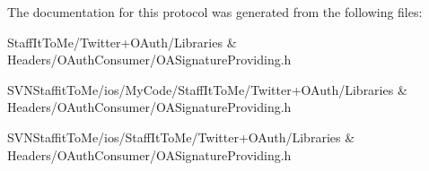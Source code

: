 \-The documentation for this protocol was generated from the following files\-:\begin{DoxyCompactItemize}
\item 
\-Staff\-It\-To\-Me/\-Twitter+\-O\-Auth/\-Libraries \& Headers/\-O\-Auth\-Consumer/\-O\-A\-Signature\-Providing.\-h\item 
\-S\-V\-N\-Staffit\-To\-Me/ios/\-My\-Code/\-Staff\-It\-To\-Me/\-Twitter+\-O\-Auth/\-Libraries \& Headers/\-O\-Auth\-Consumer/\-O\-A\-Signature\-Providing.\-h\item 
\-S\-V\-N\-Staffit\-To\-Me/ios/\-Staff\-It\-To\-Me/\-Twitter+\-O\-Auth/\-Libraries \& Headers/\-O\-Auth\-Consumer/\-O\-A\-Signature\-Providing.\-h\end{DoxyCompactItemize}
